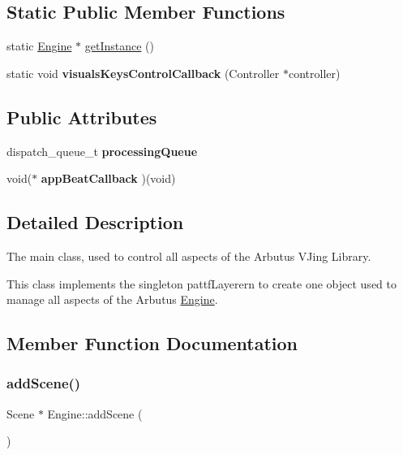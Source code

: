 \subsection*{Static Public Member Functions}
\begin{DoxyCompactItemize}
\item 
static \hyperlink{class_engine}{Engine} $\ast$ \hyperlink{class_engine_ae8f7319cf3683c23f6a215952d47ebdf}{get\+Instance} ()
\item 
\mbox{\label{class_engine_a74e15b996e9dcc8c89c3d1e3e944f07d}} 
static void {\bfseries visuals\+Keys\+Control\+Callback} (Controller $\ast$controller)
\end{DoxyCompactItemize}
\subsection*{Public Attributes}
\begin{DoxyCompactItemize}
\item 
\mbox{\label{class_engine_a3cd1207cb568ad1f8628c3d1720175b6}} 
dispatch\+\_\+queue\+\_\+t {\bfseries processing\+Queue}
\item 
\mbox{\label{class_engine_a5d74ea26de11bd68eb1c94a2580508a6}} 
void($\ast$ {\bfseries app\+Beat\+Callback} )(void)
\end{DoxyCompactItemize}


\subsection{Detailed Description}
The main class, used to control all aspects of the Arbutus V\+Jing Library. 

This class implements the singleton pattƒ\+Layerern to create one object used to manage all aspects of the Arbutus \hyperlink{class_engine}{Engine}. 

\subsection{Member Function Documentation}
\mbox{\label{class_engine_a4e9d4666046294e3d2ce91b21ce67571}} 
\subsubsection{\texorpdfstring{add\+Scene()}{addScene()}}
{\footnotesize\ttfamily Scene $\ast$ Engine\+::add\+Scene (\begin{DoxyParamCaption}{ }\end{DoxyParamCaption})}

